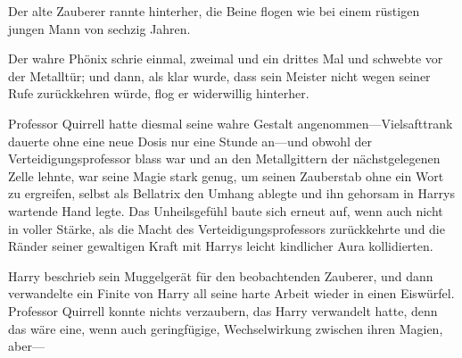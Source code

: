 Der alte Zauberer rannte hinterher, die Beine flogen wie bei einem rüstigen jungen Mann von sechzig Jahren.

Der wahre Phönix schrie einmal, zweimal und ein drittes Mal und schwebte vor der Metalltür; und dann, als klar wurde, dass sein Meister nicht wegen seiner Rufe zurückkehren würde, flog er widerwillig hinterher.

\later

Professor Quirrell hatte diesmal seine wahre Gestalt angenommen—Vielsafttrank dauerte ohne eine neue Dosis nur eine Stunde an—und obwohl der Verteidigungsprofessor blass war und an den Metallgittern der nächstgelegenen Zelle lehnte, war seine Magie stark genug, um seinen Zauberstab ohne ein Wort zu ergreifen, selbst als Bellatrix den Umhang ablegte und ihn gehorsam in Harrys wartende Hand legte. Das Unheilsgefühl baute sich erneut auf, wenn auch nicht in voller Stärke, als die Macht des Verteidigungsprofessors zurückkehrte und die Ränder seiner gewaltigen Kraft mit Harrys leicht kindlicher Aura kollidierten.

Harry beschrieb sein Muggelgerät für den beobachtenden Zauberer, und dann verwandelte ein Finite von Harry all seine harte Arbeit wieder in einen Eiswürfel. Professor Quirrell konnte nichts verzaubern, das Harry verwandelt hatte, denn das wäre eine, wenn auch geringfügige, Wechselwirkung zwischen ihren Magien, aber—

